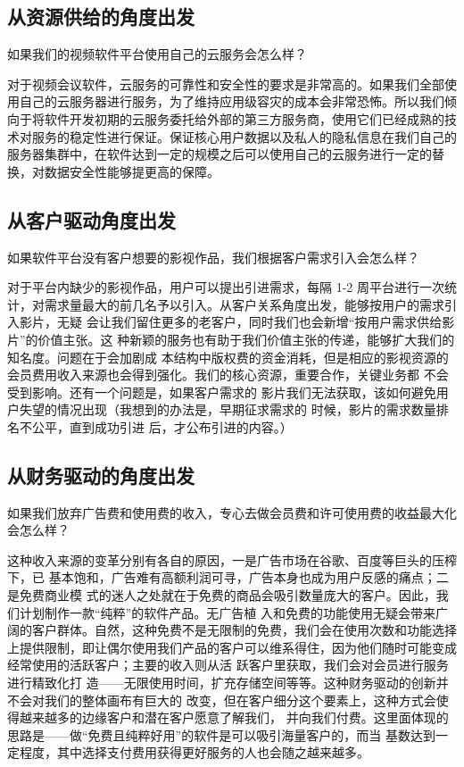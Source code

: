 \documentclass[a4paper,12pt]{article}
\begin{document}
\subsection{从资源供给的角度出发}
如果我们的视频软件平台使用自己的云服务会怎么样？

对于视频会议软件，云服务的可靠性和安全性的要求是非常高的。如果我们全部使用自己的云服务器进行服务，为了维持应用级容灾的成本会非常恐怖。所以我们倾向于将软件开发初期的云服务委托给外部的第三方服务商，使用它们已经成熟的技术对服务的稳定性进行保证。保证核心用户数据以及私人的隐私信息在我们自己的服务器集群中，在软件达到一定的规模之后可以使用自己的云服务进行一定的替换，对数据安全性能够提更高的保障。

\subsection{从客户驱动角度出发}
如果软件平台没有客户想要的影视作品，我们根据客户需求引入会怎么样？

对于平台内缺少的影视作品，用户可以提出引进需求，每隔 1-2 周平台进行一次统计，对需求量最大的前几名予以引入。从客户关系角度出发，能够按用户的需求引入影片，无疑 会让我们留住更多的老客户，同时我们也会新增“按用户需求供给影片”的价值主张。这 种新颖的服务也有助于我们价值主张的传递，能够扩大我们的知名度。问题在于会加剧成 本结构中版权费的资金消耗，但是相应的影视资源的会员费用收入来源也会得到强化。我们的核心资源，重要合作，关键业务都 不会受到影响。还有一个问题是，如果客户需求的 影片我们无法获取，该如何避免用户失望的情况出现（我想到的办法是，早期征求需求的 时候，影片的需求数量排名不公平，直到成功引进 后，才公布引进的内容。）

\subsection{从财务驱动的角度出发}
如果我们放弃广告费和使用费的收入，专心去做会员费和许可使用费的收益最大化会怎么样？

这种收入来源的变革分别有各自的原因，一是广告市场在谷歌、百度等巨头的压榨下，已 基本饱和，广告难有高额利润可寻，广告本身也成为用户反感的痛点；二是免费商业模 式的迷人之处就在于免费的商品会吸引数量庞大的客户。因此，我们计划制作一款“纯粹”的软件产品。无广告植 入和免费的功能使用无疑会带来广阔的客户群体。自然，这种免费不是无限制的免费，我们会在使用次数和功能选择上提供限制，即让偶尔使用我们产品的客户可以维系得住，因为他们随时可能变成经常使用的活跃客户；主要的收入则从活 跃客户里获取，我们会对会员进行服务进行精致化打 造——无限使用时间，扩充存储空间等等。这种财务驱动的创新并不会对我们的整体画布有巨大的 改变，但在客户细分这个要素上，这种方式会使得越来越多的边缘客户和潜在客户愿意了解我们， 并向我们付费。这里面体现的思路是——做“免费且纯粹好用”的软件是可以吸引海量客户的，而当 基数达到一定程度，其中选择支付费用获得更好服务的人也会随之越来越多。
\end{document}
